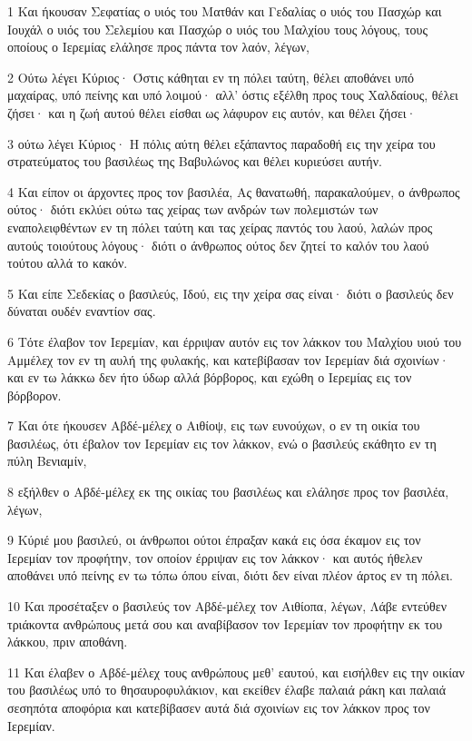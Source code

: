 \par 1 Και ήκουσαν Σεφατίας ο υιός του Ματθάν και Γεδαλίας ο υιός του Πασχώρ και Ιουχάλ ο υιός του Σελεμίου και Πασχώρ ο υιός του Μαλχίου τους λόγους, τους οποίους ο Ιερεμίας ελάλησε προς πάντα τον λαόν, λέγων,
\par 2 Ούτω λέγει Κύριος· Όστις κάθηται εν τη πόλει ταύτη, θέλει αποθάνει υπό μαχαίρας, υπό πείνης και υπό λοιμού· αλλ' όστις εξέλθη προς τους Χαλδαίους, θέλει ζήσει· και η ζωή αυτού θέλει είσθαι ως λάφυρον εις αυτόν, και θέλει ζήσει·
\par 3 ούτω λέγει Κύριος· Η πόλις αύτη θέλει εξάπαντος παραδοθή εις την χείρα του στρατεύματος του βασιλέως της Βαβυλώνος και θέλει κυριεύσει αυτήν.
\par 4 Και είπον οι άρχοντες προς τον βασιλέα, Ας θανατωθή, παρακαλούμεν, ο άνθρωπος ούτος· διότι εκλύει ούτω τας χείρας των ανδρών των πολεμιστών των εναπολειφθέντων εν τη πόλει ταύτη και τας χείρας παντός του λαού, λαλών προς αυτούς τοιούτους λόγους· διότι ο άνθρωπος ούτος δεν ζητεί το καλόν του λαού τούτου αλλά το κακόν.
\par 5 Και είπε Σεδεκίας ο βασιλεύς, Ιδού, εις την χείρα σας είναι· διότι ο βασιλεύς δεν δύναται ουδέν εναντίον σας.
\par 6 Τότε έλαβον τον Ιερεμίαν, και έρριψαν αυτόν εις τον λάκκον του Μαλχίου υιού του Αμμέλεχ τον εν τη αυλή της φυλακής, και κατεβίβασαν τον Ιερεμίαν διά σχοινίων· και εν τω λάκκω δεν ήτο ύδωρ αλλά βόρβορος, και εχώθη ο Ιερεμίας εις τον βόρβορον.
\par 7 Και ότε ήκουσεν Αβδέ-μέλεχ ο Αιθίοψ, εις των ευνούχων, ο εν τη οικία του βασιλέως, ότι έβαλον τον Ιερεμίαν εις τον λάκκον, ενώ ο βασιλεύς εκάθητο εν τη πύλη Βενιαμίν,
\par 8 εξήλθεν ο Αβδέ-μέλεχ εκ της οικίας του βασιλέως και ελάλησε προς τον βασιλέα, λέγων,
\par 9 Κύριέ μου βασιλεύ, οι άνθρωποι ούτοι έπραξαν κακά εις όσα έκαμον εις τον Ιερεμίαν τον προφήτην, τον οποίον έρριψαν εις τον λάκκον· και αυτός ήθελεν αποθάνει υπό πείνης εν τω τόπω όπου είναι, διότι δεν είναι πλέον άρτος εν τη πόλει.
\par 10 Και προσέταξεν ο βασιλεύς τον Αβδέ-μέλεχ τον Αιθίοπα, λέγων, Λάβε εντεύθεν τριάκοντα ανθρώπους μετά σου και αναβίβασον τον Ιερεμίαν τον προφήτην εκ του λάκκου, πριν αποθάνη.
\par 11 Και έλαβεν ο Αβδέ-μέλεχ τους ανθρώπους μεθ' εαυτού, και εισήλθεν εις την οικίαν του βασιλέως υπό το θησαυροφυλάκιον, και εκείθεν έλαβε παλαιά ράκη και παλαιά σεσηπότα αποφόρια και κατεβίβασεν αυτά διά σχοινίων εις τον λάκκον προς τον Ιερεμίαν.
